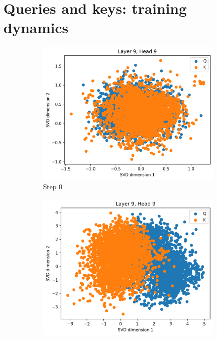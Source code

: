 \section{Queries and keys: training dynamics}
\label{sec:qk}
\begin{figure}[ht]
    \centering
    \begin{subfigure}[b]{0.48\linewidth}
         \includegraphics[width=\linewidth]{sources/part_1/anisotropy/imgs/dist_l9h9_s0.png}
         \caption{Step 0}
         \label{fig:dist_qk_s0}
    \end{subfigure}
    \begin{subfigure}[b]{0.48\linewidth}
         \includegraphics[width=\linewidth]{sources/part_1/anisotropy/imgs/dist_l9h9_s40.png}

\end{subfigure}
\end{figure}

